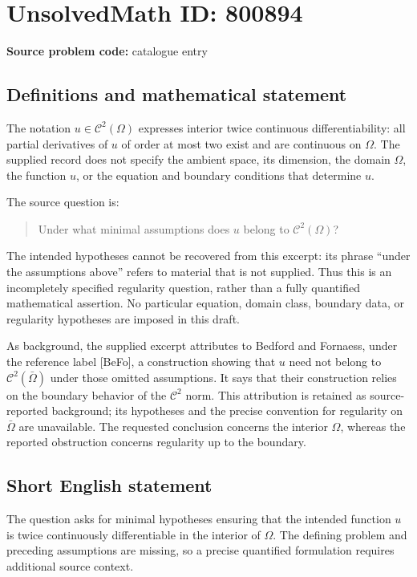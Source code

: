 \documentclass[11pt]{article}
\begin{document}
\section*{UnsolvedMath ID: 800894}
\textbf{Source problem code:} catalogue entry
\subsection{Definitions and mathematical statement}
The notation \(u\in\mathcal{C}^{2}(\Omega)\) expresses interior twice continuous differentiability: all partial derivatives of \(u\) of order at most two exist and are continuous on \(\Omega\). The supplied record does not specify the ambient space, its dimension, the domain \(\Omega\), the function \(u\), or the equation and boundary conditions that determine \(u\).

The source question is:
\begin{quote}
Under what minimal assumptions does \(u\) belong to \(\mathcal{C}^{2}(\Omega)\)?
\end{quote}
The intended hypotheses cannot be recovered from this excerpt: its phrase ``under the assumptions above'' refers to material that is not supplied. Thus this is an incompletely specified regularity question, rather than a fully quantified mathematical assertion. No particular equation, domain class, boundary data, or regularity hypotheses are imposed in this draft.

As background, the supplied excerpt attributes to Bedford and Fornaess, under the reference label [BeFo], a construction showing that \(u\) need not belong to \(\mathcal{C}^{2}(\bar\Omega)\) under those omitted assumptions. It says that their construction relies on the boundary behavior of the \(\mathcal{C}^{2}\) norm. This attribution is retained as source-reported background; its hypotheses and the precise convention for regularity on \(\bar\Omega\) are unavailable. The requested conclusion concerns the interior \(\Omega\), whereas the reported obstruction concerns regularity up to the boundary.
\subsection{Short English statement}
The question asks for minimal hypotheses ensuring that the intended function \(u\) is twice continuously differentiable in the interior of \(\Omega\). The defining problem and preceding assumptions are missing, so a precise quantified formulation requires additional source context.
\end{document}
